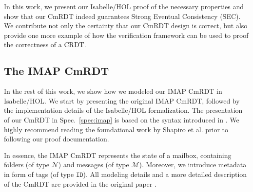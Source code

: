 \documentclass[11pt,a4paper, DIV=11]{article}
\begin{document}
In this work, we present our Isabelle/HOL proof of the necessary properties and
show that our CmRDT indeed guarantees Strong Eventual Consistency (SEC).
We contribute not only the certainty that our CmRDT design is correct,
but also provide one more example of how the verification framework
can be used to proof the correctness of a CRDT.


\subsection{The IMAP CmRDT}

In the rest of this work, we show how we modeled our IMAP CmRDT in Isabelle/HOL.
We start by presenting the original IMAP CmRDT, followed by the implementation
details of the Isabelle/HOL formalization. The presentation of our CmRDT in
Spec.~\ref{spec:imap} is based on the syntax introduced in \cite{shapiro_report}.
We highly recommend reading the foundational work by Shapiro et al{.} prior to
following our proof documentation.

In essence, the IMAP CmRDT represents the state of a mailbox, containing folders
(of type $\mathcal{N}$) and messages (of type $\mathcal{M}$). Moreover, we introduce
metadata in form of tags (of type $\texttt{ID}$). All modeling details and a more
detailed description of the CmRDT are provided in the original paper \cite{pluto}.
\end{document}
